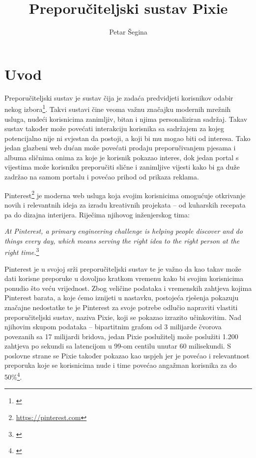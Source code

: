 \documentclass[times, utf8, seminar]{fer}
\begin{document}
\title{Preporučiteljski sustav Pixie}

\author{Petar Šegina}


\maketitle

\tableofcontents

\chapter{Uvod}

Preporučiteljski sustav je sustav čija je zadaća predvidjeti korisnikov odabir nekog izbora\footnote{\cite{mmd}}. Takvi sustavi čine veoma važnu značajku modernih mrežnih usluga, nudeći korisnicima zanimljiv, bitan i njima personaliziran sadržaj. Takav sustav također može povećati interakciju korisnika sa sadržajem za kojeg potencijalno nije ni svjestan da postoji, a koji bi mu mogao biti od interesa. Tako jedan glazbeni web dućan može povećati prodaju preporučivanjem pjesama i albuma sličnima onima za koje je korisnik pokazao interes, dok jedan portal s vijestima može korisniku preporučiti slične i zanimljive vijesti kako bi ga duže zadržao na samom portalu i povećao prihod od prikaza reklama.

Pinterest\footnote{\url{https://pinterest.com}} je moderna web usluga koja svojim korisnicima omogućuje otkrivanje novih i relevantnih ideja za izradu kreativnih projekata -- od kuharskih recepata pa do dizajna interijera. Riječima njihovog inženjerskog tima:

\begin{displayquote}
		  \textit{At Pinterest, a primary engineering challenge is helping people discover and do things every day, which means serving the right idea to the right person at the right time.}\footnote{\cite{medium-article}}
\end{displayquote}

Pinterest je u svojoj srži preporučiteljski sustav te je važno da kao takav može dati korisne preporuke u dovoljno kratkom vremenu kako bi svojim korisnicima ponudio što veću vrijednost. Zbog veličine podataka i vremenskih zahtjeva kojima Pinterest barata, a koje ćemo iznijeti u nastavku, postojeća rješenja pokazuju značajne nedostatke te je Pinterest za svoje potrebe odlučio napraviti vlastiti preporučiteljski sustav, naziva Pixie, koji se pokazao izrazito učinkovitim. Nad njihovim skupom podataka -- bipartitnim grafom od 3 milijarde čvorova povezanih sa 17 milijardi bridova, jedan Pixie poslužitelj može poslužiti 1.200 zahtjeva po sekundi sa latencijom u 99-om centilu unutar 60 milisekundi. S poslovne strane se Pixie također pokazao kao uspjeh jer je povećao i relevantnost preporuka koje se korisnicima nude i time povećao angažman korisnika za do 50\%\footnote{\cite{DBLP:journals/corr/abs-1711-07601}}.
\end{document}

